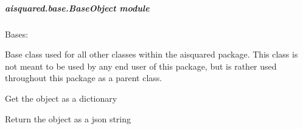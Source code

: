 \documentclass[letterpaper,10pt,english]{sphinxmanual}
\begin{document}
\subparagraph{aisquared.base.BaseObject module}
\label{\detokenize{aisquared.base:module-aisquared.base.BaseObject}}\label{\detokenize{aisquared.base:aisquared-base-baseobject-module}}

\begin{fulllineitems}
\label{\detokenize{aisquared.base:aisquared.base.BaseObject.BaseObject}}
\pysigstartsignatures
{}
\pysigstopsignatures
\sphinxAtStartPar
Bases: 

\sphinxAtStartPar
Base class used for all other classes within the aisquared package. This class is not meant
to be used by any end user of this package, but is rather used throughout this package as a
parent class.

\begin{fulllineitems}
\label{\detokenize{aisquared.base:aisquared.base.BaseObject.BaseObject.to_dict}}
\pysigstartsignatures
{}
\pysigstopsignatures
\sphinxAtStartPar
Get the object as a dictionary

\end{fulllineitems}


\begin{fulllineitems}
\label{\detokenize{aisquared.base:aisquared.base.BaseObject.BaseObject.to_json}}
\pysigstartsignatures
{}
\pysigstopsignatures
\sphinxAtStartPar
Return the object as a json string

\end{fulllineitems}


\end{fulllineitems}
\end{document}
